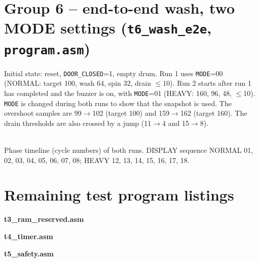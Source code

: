\documentclass[10pt,a4paper]{article}
\begin{document}
\section{Group 6 -- end-to-end wash, two MODE settings (\texttt{t6\_wash\_e2e}, \texttt{program.asm})}
Initial state: reset, \texttt{DOOR\_CLOSED}=1, empty drum. Run 1 uses \texttt{MODE}=00 (NORMAL: target 100, wash 64, spin 32,
drain $\le$10). Run 2 starts after run 1 has completed and the buzzer is on, with \texttt{MODE}=01 (HEAVY: 160, 96, 48, $\le$10).
\texttt{MODE} is changed during both runs to show that the snapshot is used. The overshoot samples are 99$\rightarrow$102
(target 100) and 159$\rightarrow$162 (target 160). The drain thresholds are also crossed by a jump (11$\rightarrow$4 and 15$\rightarrow$8).
\begin{valtab}

\end{valtab}
\begin{center}\footnotesize
\\[2pt]
Phase timeline (cycle numbers) of both runs. DISPLAY sequence NORMAL 01, 02, 03, 04, 05, 06, 07, 08; HEAVY 12, 13, 14, 15, 16, 17, 18.
\end{center}

\appendix
\section{Remaining test program listings}
\textbf{t3\_ram\_reserved.asm}
\begin{listtab}

\end{listtab}
\textbf{t4\_timer.asm}
\begin{listtab}

\end{listtab}
\textbf{t5\_safety.asm}
\begin{listtab}

\end{listtab}
\end{document}
